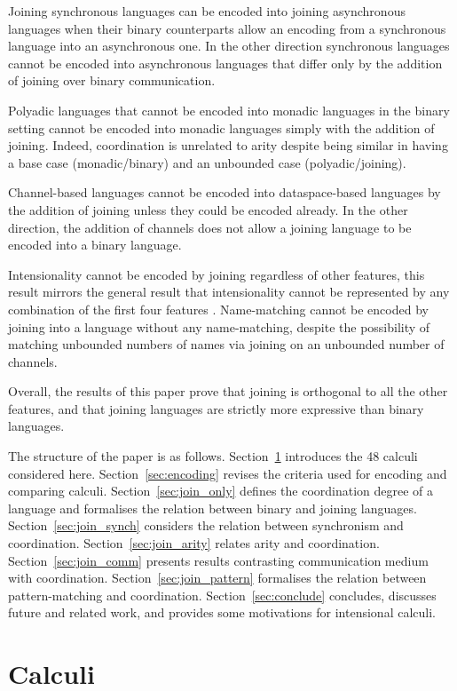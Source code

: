 \documentclass[submission,copyright,creativecommons]{eptcs}
\begin{document}
Joining synchronous languages can be encoded into joining asynchronous languages when their binary
counterparts allow an encoding from a synchronous language into an asynchronous one.
In the other direction synchronous languages cannot be encoded into
asynchronous languages that differ only by the addition of joining over binary communication.

Polyadic languages that cannot be encoded into monadic languages in the binary setting cannot be
encoded into monadic languages simply with the addition of joining. Indeed, coordination is
unrelated to arity despite being similar in having a base case (monadic/binary) and an unbounded
case (polyadic/joining).

Channel-based languages cannot be encoded into dataspace-based languages by the addition of joining
unless they could be encoded already. In the other direction, the addition of channels does not allow
a joining language to be encoded into a binary language.

Intensionality cannot be encoded by joining regardless of other features, this result mirrors
the general result that intensionality cannot be represented by any combination of the first four
features \cite{givenwilson:hal-01026301}.
Name-matching cannot be encoded by joining into a
language without any name-matching, despite the possibility of matching unbounded numbers of
names via joining on an unbounded number of channels.

Overall, the results of this paper prove that joining is orthogonal to all the other features,
and that joining languages are strictly more expressive than binary languages.

The structure of the paper is as follows.
Section~\ref{sec:calculi} introduces the 48 calculi considered here.
Section~\ref{sec:encoding} revises the criteria used for encoding and comparing calculi.
Section~\ref{sec:join_only} defines the coordination degree of a language and formalises the
relation between binary and joining languages.
Section~\ref{sec:join_synch} considers the relation between synchronism and coordination.
Section~\ref{sec:join_arity} relates arity and coordination.
Section~\ref{sec:join_comm} presents results contrasting communication medium with coordination.
Section~\ref{sec:join_pattern} formalises the relation between pattern-matching and coordination.
Section~\ref{sec:conclude} concludes, discusses future and related work, and provides some motivations
for intensional calculi.

\section{Calculi}
\label{sec:calculi}
\end{document}
